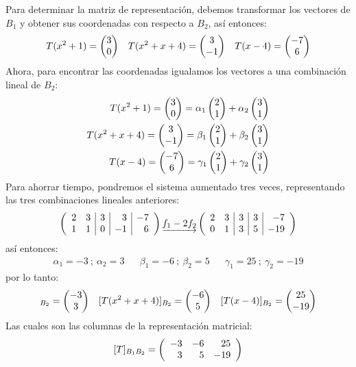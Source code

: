 \begin{sol}
    Para determinar la matriz de representación, debemos transformar los vectores de $B_1$ y obtener sus coordenadas con respecto a $B_2$, así entonces:
    \begin{align*}
        T(x^2 + 1) = \vectrdos{3}{0} && T(x^2 + x +4) = \vectrdos{3}{-1} && T(x-4) = \vectrdos{-7}{6}
    \end{align*}
    Ahora, para encontrar las coordenadas igualamos los vectores a una combinación lineal de $B_2$:
    \begin{align*}
        T(x^2 + 1) = \vectrdos{3}{0} = \alpha_1 \vectrdos{2}{1} + \alpha_2 \vectrdos{3}{1}\\
        T(x^2 + x +4) = \vectrdos{3}{-1} = \beta_1 \vectrdos{2}{1} + \beta_2 \vectrdos{3}{1}\\
        T(x-4) = \vectrdos{-7}{6} = \gamma_1 \vectrdos{2}{1} + \gamma_2 \vectrdos{3}{1}
    \end{align*}
    Para ahorrar tiempo, pondremos el sistema aumentado tres veces, representando las tres combinaciones lineales anteriores:
    $$\reducir{rr|r|r|r}{
        2&3&3&3&-7\\
        1&1&0&-1&6
    }\underrightarrow{f_1 - 2f_2}
    \reducir{rr|r|r|r}{
        2&3&3&3&-7\\
        0&1&3&5&-19
    }$$
    así entonces:
    \begin{align*}
        \alpha_1 = -3 \ ; \ \alpha_2 = 3 &&
        \beta_1 =-6 \ ; \ \beta_2 = 5 &&
        \gamma_1 = 25 \ ; \ \gamma_2 = -19
    \end{align*}
    por lo tanto:
    \begin{align*}
        [T(x^2 + 1)]_{B_2} = \vectrdos{-3}{3} && [T(x^2 + x +4)]_{B_2} = \vectrdos{-6}{5} && [T(x-4)]_{B_2} = \vectrdos{25}{-19}
    \end{align*}
    Las cuales son las columnas de la representación matricial:
    $$[T]_{B_1 B_2} = \reducir{rrr}{
        -3&-6&25\\
        3&5&-19
    }$$
\end{sol}



